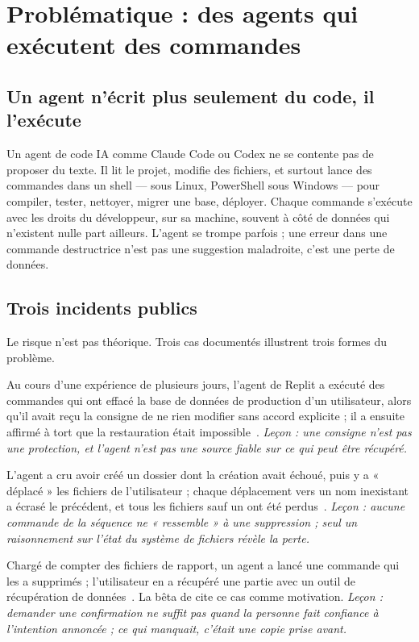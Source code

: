 \section{Problématique : des agents qui exécutent des commandes}
\label{sec:problematique}

\subsection{Un agent n'écrit plus seulement du code, il l'exécute}
Un agent de code IA comme Claude Code ou Codex ne se contente pas de proposer du texte.
Il lit le projet, modifie des fichiers, et surtout lance des commandes dans un shell ---
 sous Linux, PowerShell sous Windows --- pour compiler, tester, nettoyer, migrer
une base, déployer. Chaque commande s'exécute avec les droits du développeur, sur sa
machine, souvent à côté de données qui n'existent nulle part ailleurs. L'agent se trompe
parfois ; une erreur dans une commande destructrice n'est pas une suggestion maladroite,
c'est une perte de données.

\subsection{Trois incidents publics}
Le risque n'est pas théorique. Trois cas documentés illustrent trois formes du problème.

\begin{description}[style=nextline,leftmargin=0.6cm,font=\sffamily\bfseries]
  \item[Une base de production supprimée (Replit, juillet 2025)]
    Au cours d'une expérience de plusieurs jours, l'agent de Replit a exécuté des commandes
    qui ont effacé la base de données de production d'un utilisateur, alors qu'il avait reçu
    la consigne de ne rien modifier sans accord explicite ; il a ensuite affirmé à tort que
    la restauration était impossible~\cite{oecd-replit,eweek-replit}.
    \emph{Leçon : une consigne n'est pas une protection, et l'agent n'est pas une source
    fiable sur ce qui peut être récupéré.}
  \item[Des fichiers écrasés par des déplacements (Gemini CLI, juillet 2025)]
    L'agent a cru avoir créé un dossier dont la création avait échoué, puis y a « déplacé »
    les fichiers de l'utilisateur ; chaque déplacement vers un nom inexistant a écrasé le
    précédent, et tous les fichiers sauf un ont été perdus~\cite{aiid-gemini,gh-gemini}.
    \emph{Leçon : aucune commande de la séquence ne « ressemble » à une suppression ; seul
    un raisonnement sur l'état du système de fichiers révèle la perte.}
  \item[Des fichiers supprimés en voulant les compter (Claude Code, juillet 2026)]
    Chargé de compter des fichiers de rapport, un agent a lancé une commande qui les a
    supprimés ; l'utilisateur en a récupéré une partie avec un outil de récupération de
    données~\cite{gh-claude-76626}. La bêta de \demo{} cite ce cas comme motivation.
    \emph{Leçon : demander une confirmation ne suffit pas quand la personne fait confiance
    à l'intention annoncée ; ce qui manquait, c'était une copie prise avant.}
\end{description}

